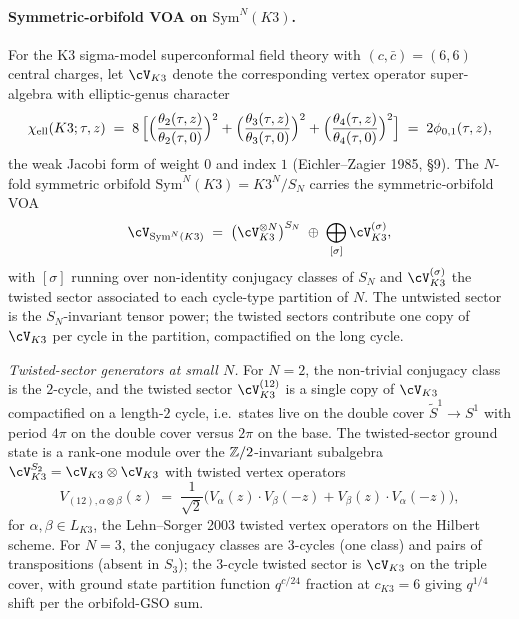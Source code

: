 \paragraph{Symmetric-orbifold VOA on $\mathrm{Sym}^N(K3)$.}
For the K3 sigma-model superconformal field theory with
$(c,\bar c) = (6,6)$ central charges, let $\cV_{K3}$ denote the
corresponding vertex operator super-algebra with elliptic-genus
character
\begin{equation}
\label{eq:voa-K3-ell-genus}
  \chi_{\mathrm{ell}}(K3; \tau, z) \;=\; 8\,\Bigl[
    \Bigl(\frac{\theta_2(\tau,z)}{\theta_2(\tau,0)}\Bigr)^2 +
    \Bigl(\frac{\theta_3(\tau,z)}{\theta_3(\tau,0)}\Bigr)^2 +
    \Bigl(\frac{\theta_4(\tau,z)}{\theta_4(\tau,0)}\Bigr)^2
  \Bigr] \;=\; 2\phi_{0,1}(\tau,z),
\end{equation}
the weak Jacobi form of weight $0$ and index $1$ (Eichler--Zagier 1985,
\S9). The $N$-fold symmetric orbifold $\mathrm{Sym}^N(K3) = K3^N/S_N$
carries the symmetric-orbifold VOA
\begin{equation}
\label{eq:voa-sym-orbifold}
  \cV_{\mathrm{Sym}^N(K3)} \;=\; \bigl(\cV_{K3}^{\otimes N}\bigr)^{S_N} \;\oplus\; \bigoplus_{[\sigma]}\cV_{K3}^{(\sigma)},
\end{equation}
with $[\sigma]$ running over non-identity conjugacy classes of $S_N$
and $\cV_{K3}^{(\sigma)}$ the twisted sector associated to each
cycle-type partition of $N$. The untwisted sector is the $S_N$-invariant
tensor power; the twisted sectors contribute one copy of $\cV_{K3}$
per cycle in the partition, compactified on the long cycle.

\emph{Twisted-sector generators at small $N$.} For $N = 2$, the
non-trivial conjugacy class is the $2$-cycle, and the twisted sector
$\cV_{K3}^{(12)}$ is a single copy of $\cV_{K3}$ compactified on a
length-$2$ cycle, i.e.\ states live on the double cover
$\tilde S^1 \to S^1$ with period $4\pi$ on the double cover versus
$2\pi$ on the base. The twisted-sector ground state is a rank-one
module over the $\mathbb{Z}/2$-invariant subalgebra
$\cV_{K3}^{S_2} = \cV_{K3}\otimes\cV_{K3}$ with twisted vertex operators
\[
  V_{(12), \alpha\otimes\beta}(z) \;=\; \frac{1}{\sqrt{2}}\bigl(V_\alpha(z)\cdot V_\beta(-z) + V_\beta(z)\cdot V_\alpha(-z)\bigr),
\]
for $\alpha,\beta \in L_{K3}$, the Lehn--Sorger 2003 twisted vertex
operators on the Hilbert scheme. For $N = 3$, the conjugacy classes are
$3$-cycles (one class) and pairs of transpositions (absent in $S_3$);
the $3$-cycle twisted sector is $\cV_{K3}$ on the triple cover, with
ground state partition function $q^{c/24}$ fraction at $c_{K3} = 6$
giving $q^{1/4}$ shift per the orbifold-GSO sum.

